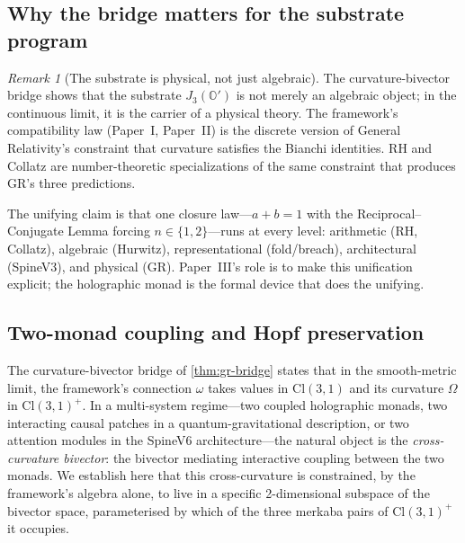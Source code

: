 \documentclass[11pt,a4paper]{article}
\theoremstyle{plain}
\theoremstyle{definition}
\theoremstyle{remark}
\newtheorem{remark}[theorem]{Remark}
\numberwithin{equation}{section}
\providecommand{\Cl}{\mathrm{Cl}}
\providecommand{\Os}{\mathbb{O}'}
\begin{document}
\subsection{Why the bridge matters for the substrate program}

\begin{remark}[The substrate is physical, not just algebraic]
\label{rmk:substrate-physical}
The curvature-bivector bridge shows that the substrate $J_3(\Os)$
is not merely an algebraic object; in the continuous limit, it is
the carrier of a physical theory.  The framework's compatibility
law (Paper~I, Paper~II) is the discrete version of General
Relativity's constraint that curvature satisfies the Bianchi
identities.  RH and Collatz are number-theoretic specializations
of the same constraint that produces GR's three predictions.

The unifying claim is that one closure law---$a + b = 1$ with the
Reciprocal--Conjugate Lemma forcing $n \in \{1, 2\}$---runs at
every level: arithmetic (RH, Collatz), algebraic (Hurwitz),
representational (fold/breach), architectural (SpineV3), and
physical (GR).  Paper~III's role is to make this unification
explicit; the holographic monad is the formal device that does
the unifying.
\end{remark}

\subsection{Two-monad coupling and Hopf preservation}
\label{sec:two-monad-coupling}

The curvature-bivector bridge of \cref{thm:gr-bridge} states that
in the smooth-metric limit, the framework's connection $\omega$
takes values in $\Cl(3,1)$ and its curvature $\Omega$ in
$\Cl(3,1)^+$.  In a multi-system regime---two coupled holographic
monads, two interacting causal patches in a quantum-gravitational
description, or two attention modules in the SpineV6
architecture---the natural object is the
\emph{cross-curvature bivector}: the bivector mediating
interactive coupling between the two monads.  We establish here
that this cross-curvature is constrained, by the framework's
algebra alone, to live in a specific 2-dimensional subspace of
the bivector space, parameterised by which of the three merkaba
pairs of $\Cl(3,1)^+$ it occupies.
\end{document}
